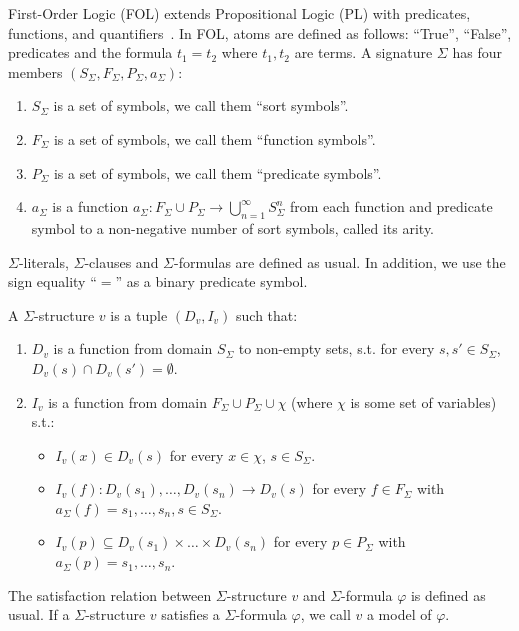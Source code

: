 \documentclass[12pt,a4paper]{article}
\theoremstyle{definition}
\begin{document}
First-Order Logic (FOL) extends Propositional Logic (PL) with predicates,
functions, and quantifiers~\cite{BradleyM07}. In FOL, atoms are defined as
follows: ``True'', ``False'', predicates and the formula $t_1 = t_2$ where
$t_1, t_2$ are terms. A signature $\Sigma$ has four members
$(S_\Sigma, F_\Sigma, P_\Sigma, a_\Sigma)$:
\begin{enumerate}
  \item $S_\Sigma$ is a set of symbols, we call them ``sort symbols''.
  \item $F_\Sigma$ is a set of symbols, we call them ``function symbols''.
  \item $P_\Sigma$ is a set of symbols, we call them ``predicate symbols''.
  \item $a_\Sigma$ is a function
        $a_\Sigma : F_\Sigma \cup P_\Sigma \to \bigcup_{n=1}^{\infty} S_\Sigma^n$
        from each function and predicate symbol to a non-negative number of sort
        symbols, called its arity.
\end{enumerate}
$\Sigma$-literals, $\Sigma$-clauses and $\Sigma$-formulas are defined as usual. In
addition, we use the sign equality ``$=$'' as a binary predicate symbol.

A $\Sigma$-structure $v$ is a tuple $(D_v, I_v)$ such that:
\begin{enumerate}
  \item $D_v$ is a function from domain $S_\Sigma$ to non-empty sets, s.t. for
        every $s, s' \in S_\Sigma$, $D_v(s) \cap D_v(s') = \emptyset$.
  \item $I_v$ is a function from domain $F_\Sigma \cup P_\Sigma \cup \chi$ (where
        $\chi$ is some set of variables) s.t.:
        \begin{itemize}
          \item $I_v(x) \in D_v(s)$ for every $x \in \chi$, $s \in S_\Sigma$.
          \item $I_v(f) : D_v(s_1), \dots, D_v(s_n) \to D_v(s)$ for every
                $f \in F_\Sigma$ with $a_\Sigma(f) = s_1, \dots, s_n,\allowbreak s \in S_\Sigma$.
          \item $I_v(p) \subseteq D_v(s_1) \times \dots \times D_v(s_n)$ for every
                $p \in P_\Sigma$ with $a_\Sigma(p) = s_1, \dots, s_n$.
        \end{itemize}
\end{enumerate}
The satisfaction relation between $\Sigma$-structure $v$ and $\Sigma$-formula
$\varphi$ is defined as usual. If a $\Sigma$-structure $v$ satisfies a
$\Sigma$-formula $\varphi$, we call $v$ a model of $\varphi$.
\end{document}

